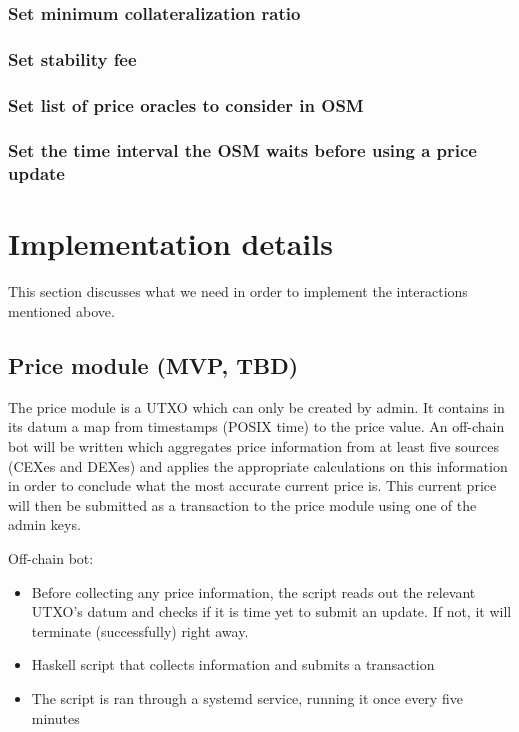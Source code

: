 \documentclass{article} %
\begin{document}
\subsubsection{Set minimum collateralization ratio}

\subsubsection{Set stability fee}

\subsubsection{Set list of price oracles to consider in OSM}

\subsubsection{Set the time interval the OSM waits before using a price update}


\section{Implementation details}

This section discusses what we need in order to implement the interactions
mentioned above.

\subsection{Price module (MVP, TBD)}

The price module is a UTXO which can only be created by admin.
It contains in its datum a map from timestamps (POSIX time) to the price value.
An off-chain bot will be written which aggregates price information from at
least five sources (CEXes and DEXes) and applies the appropriate calculations on
this information in order to conclude what the most accurate current price is.
This current price will then be submitted as a transaction to the price module
using one of the admin keys.

Off-chain bot:
\begin{itemize}
  \item Before collecting any price information, the script reads out the
    relevant UTXO's datum and checks if it is time yet to submit an update. If
    not, it will terminate (successfully) right away.
  \item Haskell script that collects information and submits a transaction
  \item The script is ran through a systemd service, running it once every five
    minutes
\end{itemize}
\end{document}
